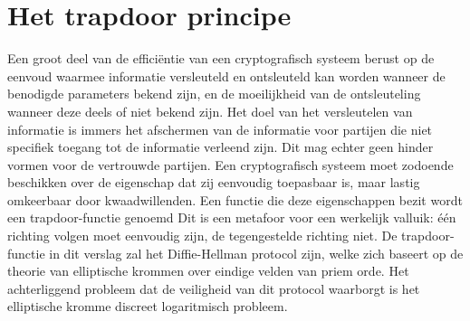 \documentclass{article}
\begin{document}
\section*{Het trapdoor principe}
Een groot deel van de effici\"{e}ntie van een cryptografisch systeem berust op de eenvoud waarmee informatie versleuteld en ontsleuteld kan worden wanneer de benodigde parameters bekend zijn, en de moeilijkheid van de ontsleuteling wanneer deze deels of niet bekend zijn. Het doel 
van het versleutelen van informatie is immers het afschermen van de informatie voor partijen die niet specifiek toegang tot de informatie verleend zijn. Dit mag echter geen hinder vormen voor de vertrouwde partijen. Een cryptografisch systeem moet zodoende beschikken over de eigenschap 
dat zij eenvoudig toepasbaar is, maar lastig omkeerbaar door kwaadwillenden. Een functie die deze eigenschappen bezit wordt een trapdoor-functie genoemd Dit is een metafoor voor een werkelijk valluik: \'{e}\'{e}n richting volgen moet eenvoudig zijn, de tegengestelde richting niet. 
De trapdoor-functie in dit verslag zal het Diffie-Hellman protocol zijn, welke zich baseert op de theorie van elliptische krommen over eindige velden van priem orde. Het achterliggend probleem dat de veiligheid van dit protocol waarborgt is het elliptische kromme discreet logaritmisch probleem.
\end{document}
